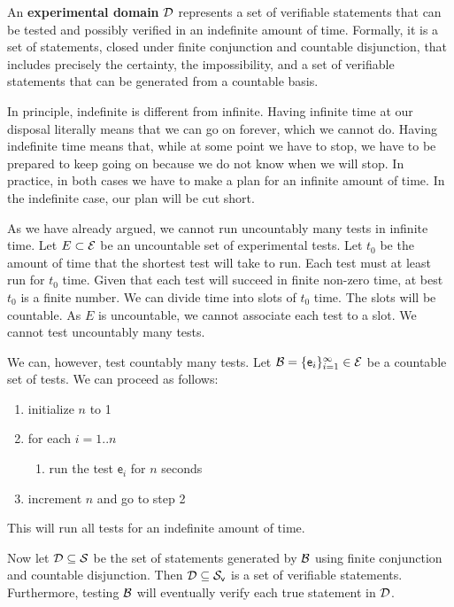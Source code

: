 	\begin{mathSection}
		\begin{defn}\label{pm-vs-defExperimentalDomain}
			An \textbf{experimental domain} $\mathcal{D}$ represents a set of verifiable statements that can be tested and possibly verified  in an indefinite amount of time. Formally, it is a set of statements, closed under finite conjunction and countable disjunction, that includes precisely the certainty, the impossibility, and a set of verifiable statements that can be generated from a countable basis.
		\end{defn}
		\begin{justification}
			In principle, indefinite is different from infinite. Having infinite time at our disposal literally means that we can go on forever, which we cannot do. Having indefinite time means that, while at some point we have to stop, we have to be prepared to keep going on because we do not know when we will stop. In practice, in both cases we have to make a plan for an infinite amount of time. In the indefinite case, our plan will be cut short.
			
			As we have already argued, we cannot run uncountably many tests in infinite time. Let $E \subset \mathcal{E}$ be an uncountable set of experimental tests. Let $t_0$ be the amount of time that the shortest test will take to run. Each test must at least run for $t_0$ time. Given that each test will succeed in finite non-zero time, at best $t_0$ is a finite number. We can divide time into slots of $t_0$ time. The slots will be countable. As $E$ is uncountable, we cannot associate each test to a slot. We cannot test uncountably many tests.
			
			We can, however, test countably many tests. Let $\mathcal{B} = \{\mathsf{e}_i\}_{i=1}^{\infty} \in \mathcal{E}$ be a countable set of tests. We can proceed as follows:
			\begin{enumerate}
				\item initialize $n$ to 1
				\item for each $i=1..n$
				\begin{enumerate}
					\item run the test $\mathsf{e}_i$ for $n$ seconds
				\end{enumerate}
				\item increment $n$ and go to step 2
			\end{enumerate}	
			This will run all tests for an indefinite amount of time.
			
			Now let $\mathcal{D} \subseteq \mathcal{S}$ be the set of statements generated by $\mathcal{B}$ using finite conjunction and countable disjunction. Then $\mathcal{D} \subseteq \mathcal{S}_\textsf{v}$ is a set of verifiable statements. Furthermore, testing $\mathcal{B}$ will eventually verify each true statement in $\mathcal{D}$.
			

\end{justification}
\end{mathSection}

